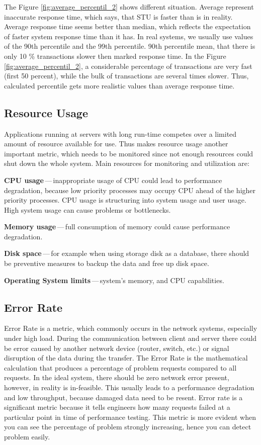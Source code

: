 The Figure \ref{fig:average_percentil_2} shows different situation. Average represent inaccurate response time, which says, that STU is faster than is in reality. Average response time seems better than median, which reflects the expectation of faster system response time than it has. In real systems, we usually use values of the 90th percentile and the 99th percentile. 90th percentile mean, that there is only 10 \% transactions slower then marked response time. In the Figure \ref{fig:average_percentil_2}, a considerable percentage of transactions are very fast (first 50 percent), while the bulk of transactions are several times slower. Thus, calculated percentile gets more realistic values than average response time.

\subsection{Resource Usage}
Applications running at servers with long run-time competes over a limited amount of resource available for use. Thus makes resource usage another important metric, which needs to be monitored since not enough resources could shut down the whole system. Main resources for monitoring and utilization are:

\begin{description}
	\setlength\itemsep{0em}
	\item \textbf{CPU usage}\,---\,inappropriate usage of CPU could lead to performance degradation, because low priority processes may occupy CPU ahead of the higher priority processes. CPU usage is structuring into system usage and user usage. High system usage can cause problems or bottlenecks.
	\item \textbf{Memory usage}\,---\,full consumption of memory could cause performance degradation.
	\item \textbf{Disk space}\,---\,for example when using storage disk as a database, there should be preventive measures to backup the data and free up disk space.
	\item \textbf{Operating System limits}\,---\,system's memory, and CPU capabilities. 
\end{description}


\subsection{Error Rate}
Error Rate is a metric, which commonly occurs in the network systems, especially under high load. During the communication between client and server there could be error caused by another network device (router, switch, etc.) or signal disruption of the data during the transfer. The Error Rate is the mathematical calculation that produces a percentage of problem requests compared to all requests. In the ideal system, there should be zero network error present, however, in reality is in-feasible. This usually leads to a performance degradation and low throughput, because damaged data need to be resent.
Error rate is a significant metric because it tells engineers how many requests failed at a particular point in time of performance testing. This metric is more evident when you can see the percentage of problem strongly increasing, hence you can detect problem easily.


